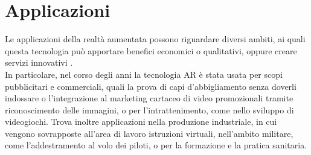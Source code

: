 \documentclass[crop=false, class=book]{standalone}
\begin{document}
	\section{Applicazioni}	
	Le applicazioni della realtà aumentata possono riguardare diversi ambiti, ai quali questa tecnologia può apportare benefici economici o qualitativi, oppure creare servizi innovativi \cite{carmigniani2011augmented}. 
	\\
	In particolare, nel corso degli anni la tecnologia AR è stata usata per scopi pubblicitari e commerciali, quali la prova di capi d'abbigliamento senza doverli indossare o l'integrazione al marketing cartaceo di video promozionali tramite riconoscimento delle immagini, o per l'intrattenimento, come nello sviluppo di videogiochi. Trova inoltre applicazioni nella produzione industriale, in cui vengono sovrapposte all'area di lavoro istruzioni virtuali, nell'ambito militare, come l'addestramento al volo dei piloti, o per la formazione e la pratica sanitaria.
	
	 
\end{document}
